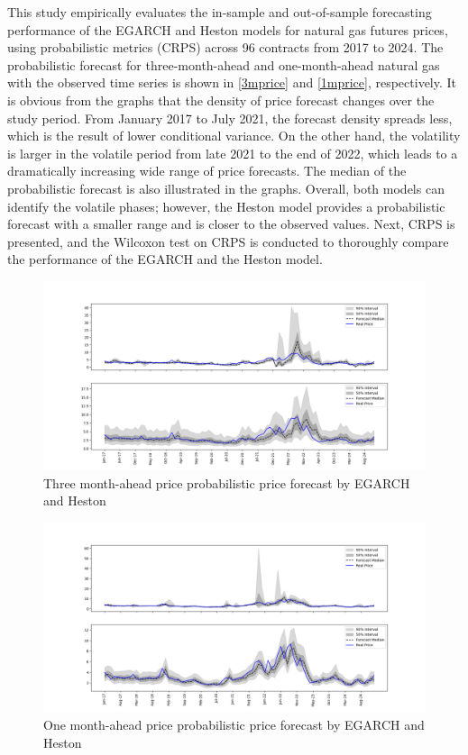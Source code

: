\documentclass[12pt,a4paper]{article}
\newcommand\colorAutoref[1]{{\hypersetup{linkcolor=black}\autoref{#1}}}
\numberwithin{equation}{section}
\begin{document}
This study empirically evaluates the in-sample and out-of-sample forecasting performance of the EGARCH and Heston models for natural gas futures prices, using probabilistic metrics (CRPS) across 96 contracts from 2017 to 2024. The probabilistic forecast for three-month-ahead and one-month-ahead natural gas with the observed time series is shown in \colorAutoref{3mprice} and \colorAutoref{1mprice}, respectively. It is obvious from the graphs that the density of price forecast changes over the study period. From January 2017 to July 2021, the forecast density spreads less, which is the result of lower conditional variance. On the other hand, the volatility is larger in the volatile period from late 2021 to the end of 2022, which leads to a dramatically increasing wide range of price forecasts. The median of the probabilistic forecast is also illustrated in the graphs. Overall, both models can identify the volatile phases; however, the Heston model provides a probabilistic forecast with a smaller range and is closer to the observed values. Next, CRPS is presented, and the Wilcoxon test on CRPS is conducted to thoroughly compare the performance of the EGARCH and the Heston model.

 
\begin{figure}[h!] 
\includegraphics[scale=1,width=1\linewidth,height=0.3\textheight]{3mpriceprob.png}
\caption{Three month-ahead price probabilistic price forecast by EGARCH and Heston}
\label{3mprice}
\end{figure}

\begin{figure}[h!] 
\includegraphics[scale=1,width=1\linewidth,height=0.3\textheight]{1mpriceprob.png}
\caption{One month-ahead price probabilistic price forecast by EGARCH and Heston}
\label{1mprice}
\end{figure}
\end{document}
